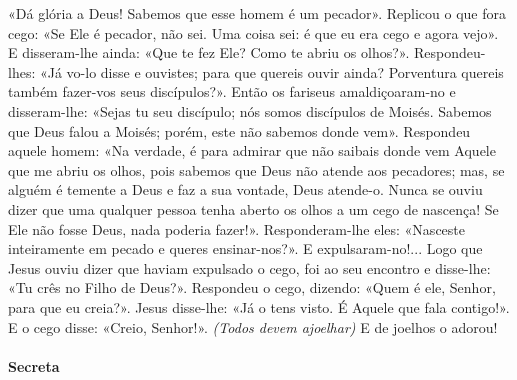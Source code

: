 \begin{paracol}{2}
{«Dá glória a Deus! Sabemos que esse homem é um pecador». Replicou o que fora cego: «Se Ele é pecador, não sei. Uma coisa sei: é que eu era cego e agora vejo». E disseram-lhe ainda: «Que te fez Ele? Como te abriu os olhos?». Respondeu-lhes: «Já vo-lo disse e ouvistes; para que quereis ouvir ainda? Porventura quereis também fazer-vos seus discípulos?». Então os fariseus amaldiçoaram-no e disseram-lhe: «Sejas tu seu discípulo; nós somos discípulos de Moisés. Sabemos que Deus falou a Moisés; porém, este não sabemos donde vem». Respondeu aquele homem: «Na verdade, é para admirar que não saibais donde vem Aquele que me abriu os olhos, pois sabemos que Deus não atende aos pecadores; mas, se alguém é temente a Deus e faz a sua vontade, Deus atende-o. Nunca se ouviu dizer que uma qualquer pessoa tenha aberto os olhos a um cego de nascença! Se Ele não fosse Deus, nada poderia fazer!». Responderam-lhe eles: «Nasceste inteiramente em pecado e queres ensinar-nos?». E expulsaram-no!... Logo que Jesus ouviu dizer que haviam expulsado o cego, foi ao seu encontro e disse-lhe: «Tu crês no Filho de Deus?». Respondeu o cego, dizendo: «Quem é ele, Senhor, para que eu creia?». Jesus disse-lhe: «Já o tens visto. É Aquele que fala contigo!». E o cego disse: «Creio, Senhor!». \emph{(Todos devem ajoelhar)} E de joelhos o adorou!
}\end{paracol}

\begin{paracol}{2}\switchcolumn{}\end{paracol}

\paragraph{Secreta}
\begin{paracol}{2}\switchcolumn{}\end{paracol}


